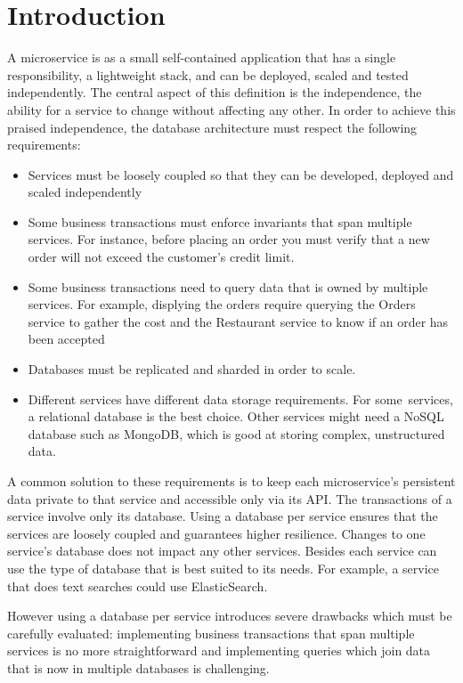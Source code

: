 \documentclass[conference]{IEEEtran}
\begin{document}
\section{Introduction}
A microservice is as a small self-contained application that has a single responsibility, a lightweight stack, and can be deployed, scaled and tested independently. \cite{exploring-microservices} The central aspect of this definition is the independence, the ability for a service to change without affecting any other.
In order to achieve this praised independence, the database architecture must respect the following requirements:
\begin{itemize}
  \item Services must be loosely coupled so that they can be developed, deployed and scaled independently
  \item Some business transactions must enforce invariants that span multiple services. For instance, before placing an order you must verify that a new order will not exceed the customer’s credit limit.
  \item Some business transactions need to query data that is owned by multiple services. For example, displying the orders require querying the Orders service to gather the cost and the Restaurant service to know if an order has been accepted
  \item Databases must be replicated and sharded in order to scale.
  \item Different services have different data storage requirements. For some services, a relational database is the best choice. Other services might need a NoSQL database such as MongoDB, which is good at storing complex, unstructured data.
\end{itemize}

A common solution to these requirements is to keep each microservice’s persistent data private to that service and accessible only via its API. The transactions of a service involve only its database. 
Using a database per service ensures that the services are loosely coupled and guarantees higher resilience. Changes to one service’s database does not impact any other services. Besides each service can use the type of database that is best suited to its needs. For example, a service that does text searches could use ElasticSearch. \cite{database-per-service} 

However using a database per service introduces severe drawbacks which must be carefully evaluated: implementing business transactions that span multiple services is no more straightforward and  implementing queries which join data that is now in multiple databases is challenging.
\end{document}
